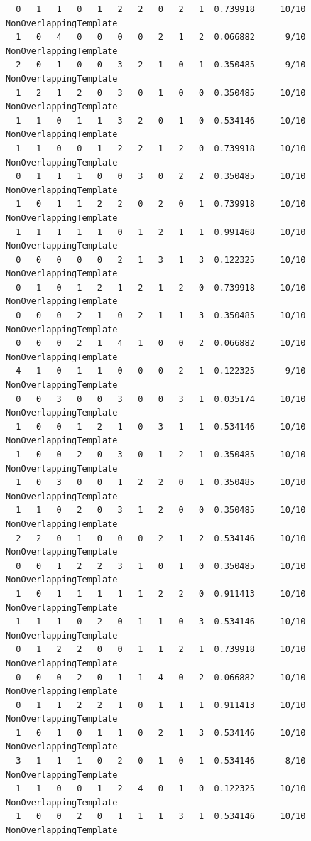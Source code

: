 \documentclass[12pt, titlepage]{report}
\theoremstyle{definition}
\begin{document}
{\begin{verbatim}
  0   1   1   0   1   2   2   0   2   1  0.739918     10/10      NonOverlappingTemplate
  1   0   4   0   0   0   0   2   1   2  0.066882      9/10      NonOverlappingTemplate
  2   0   1   0   0   3   2   1   0   1  0.350485      9/10      NonOverlappingTemplate
  1   2   1   2   0   3   0   1   0   0  0.350485     10/10      NonOverlappingTemplate
  1   1   0   1   1   3   2   0   1   0  0.534146     10/10      NonOverlappingTemplate
  1   1   0   0   1   2   2   1   2   0  0.739918     10/10      NonOverlappingTemplate
  0   1   1   1   0   0   3   0   2   2  0.350485     10/10      NonOverlappingTemplate
  1   0   1   1   2   2   0   2   0   1  0.739918     10/10      NonOverlappingTemplate
  1   1   1   1   1   0   1   2   1   1  0.991468     10/10      NonOverlappingTemplate
  0   0   0   0   0   2   1   3   1   3  0.122325     10/10      NonOverlappingTemplate
  0   1   0   1   2   1   2   1   2   0  0.739918     10/10      NonOverlappingTemplate
  0   0   0   2   1   0   2   1   1   3  0.350485     10/10      NonOverlappingTemplate
  0   0   0   2   1   4   1   0   0   2  0.066882     10/10      NonOverlappingTemplate
  4   1   0   1   1   0   0   0   2   1  0.122325      9/10      NonOverlappingTemplate
  0   0   3   0   0   3   0   0   3   1  0.035174     10/10      NonOverlappingTemplate
  1   0   0   1   2   1   0   3   1   1  0.534146     10/10      NonOverlappingTemplate
  1   0   0   2   0   3   0   1   2   1  0.350485     10/10      NonOverlappingTemplate
  1   0   3   0   0   1   2   2   0   1  0.350485     10/10      NonOverlappingTemplate
  1   1   0   2   0   3   1   2   0   0  0.350485     10/10      NonOverlappingTemplate
  2   2   0   1   0   0   0   2   1   2  0.534146     10/10      NonOverlappingTemplate
  0   0   1   2   2   3   1   0   1   0  0.350485     10/10      NonOverlappingTemplate
  1   0   1   1   1   1   1   2   2   0  0.911413     10/10      NonOverlappingTemplate
  1   1   1   0   2   0   1   1   0   3  0.534146     10/10      NonOverlappingTemplate
  0   1   2   2   0   0   1   1   2   1  0.739918     10/10      NonOverlappingTemplate
  0   0   0   2   0   1   1   4   0   2  0.066882     10/10      NonOverlappingTemplate
  0   1   1   2   2   1   0   1   1   1  0.911413     10/10      NonOverlappingTemplate
  1   0   1   0   1   1   0   2   1   3  0.534146     10/10      NonOverlappingTemplate
  3   1   1   1   0   2   0   1   0   1  0.534146      8/10      NonOverlappingTemplate
  1   1   0   0   1   2   4   0   1   0  0.122325     10/10      NonOverlappingTemplate
  1   0   0   2   0   1   1   1   3   1  0.534146     10/10      NonOverlappingTemplate

\end{verbatim}}
\end{document}

